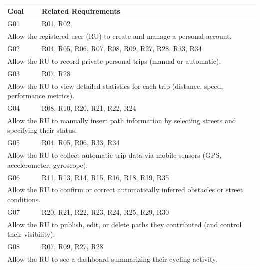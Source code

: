 \begin{longtable}{|l|p{}|}
    \hline
    \textbf{Goal} & \textbf{Related Requirements} \\
    \hline \hline

    G01 & R01, R02 \\
    \hline
    \multicolumn{2}{|p{0.8\textwidth}|}{Allow the registered user (RU) to create and manage a personal account.} \\
    \hline \hline

    G02 & R04, R05, R06, R07, R08, R09, R27, R28, R33, R34 \\
    \hline
    \multicolumn{2}{|p{0.8\textwidth}|}{Allow the RU to record private personal trips (manual or automatic).} \\
    \hline \hline

    G03 & R07, R28 \\
    \hline
    \multicolumn{2}{|p{0.8\textwidth}|}{Allow the RU to view detailed statistics for each trip (distance, speed, performance metrics).} \\
    \hline \hline

    G04 & R08, R10, R20, R21, R22, R24 \\
    \hline
    \multicolumn{2}{|p{0.8\textwidth}|}{Allow the RU to manually insert path information by selecting streets and specifying their status.} \\
    \hline \hline

    G05 & R04, R05, R06, R33, R34 \\
    \hline
    \multicolumn{2}{|p{0.8\textwidth}|}{Allow the RU to collect automatic trip data via mobile sensors (GPS, accelerometer, gyroscope).} \\
    \hline \hline

    G06 & R11, R13, R14, R15, R16, R18, R19, R35 \\
    \hline
    \multicolumn{2}{|p{0.8\textwidth}|}{Allow the RU to confirm or correct automatically inferred obstacles or street conditions.} \\
    \hline \hline

    G07 & R20, R21, R22, R23, R24, R25, R29, R30 \\
    \hline
    \multicolumn{2}{|p{0.8\textwidth}|}{Allow the RU to publish, edit, or delete paths they contributed (and control their visibility).} \\
    \hline \hline

    G08 & R07, R09, R27, R28 \\
    \hline
    \multicolumn{2}{|p{0.8\textwidth}|}{Allow the RU to see a dashboard summarizing their cycling activity.} \\
    \hline \hline


\end{longtable}
